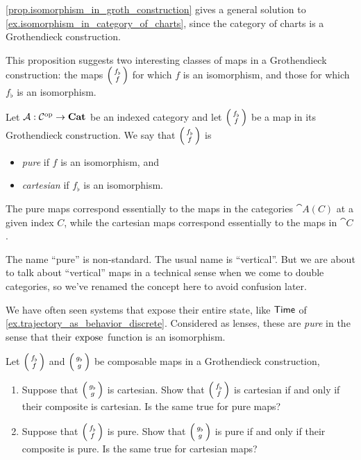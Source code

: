 \documentclass[DynamicalBook]{subfiles}
\begin{document}
\begin{remark}
  \cref{prop.isomorphism_in_groth_construction} gives a general solution to
  \cref{ex.isomorphism_in_category_of_charts}, since the category of charts is a
  Grothendieck construction.
\end{remark}

This proposition suggests two interesting classes of maps in a Grothendieck
construction: the maps $\lens{f_{\flat}}{f}$ for which $f$ is an isomorphism, and
those for which $f_{\flat}$ is an isomorphism.
\begin{definition}\label{def.pure_and_cartesian}
Let $\mathcal{A} : \mathcal{C}^{\textnormal{op}} \to \textbf{Cat}$ be an indexed category and let
$\lens{f_{\flat}}{f}$ be a map in its Grothendieck construction. We say that
$\lens{f_{\flat}}{f}$ is
\begin{itemize}
\item \emph{pure} if $f$ is an isomorphism, and
 \item \emph{cartesian} if $f_{\flat}$ is an isomorphism.
\end{itemize}
\end{definition}

The pure maps correspond essentially to the maps in the categories $\cat{A}(C)$
at a given index $C$, while the cartesian maps correspond essentially to the
maps in $\cat{C}$.

\begin{remark}
  The name ``pure'' is non-standard. The usual name is ``vertical''. But we are
  about to talk about ``vertical'' maps in a technical sense when we come to
  double categories, so we've renamed the concept here to avoid confusion later.
\end{remark}

\begin{example}
  We have often seen systems that expose their entire state, like $\mathsf{Time}$ 
  of \cref{ex.trajectory_as_behavior_discrete}. Considered as lenses, these are
  \emph{pure} in the sense that their $\mathrm{expose}_{\mathsf{}}$ function is an isomorphism.
\end{example}

\begin{exercise}\label{ex.2-of-3_for_pure_cartesian}
  Let $\lens{f_{\flat}}{f}$ and $\lens{g_{\flat}}{g}$ be composable maps in a Grothendieck construction,
  \begin{enumerate}
    \item Suppose that $\lens{g_{\flat}}{g}$ is cartesian.  Show that
      $\lens{f_{\flat}}{f}$ is cartesian if and only if their composite is
      cartesian. Is the same true for pure maps?
    \item Suppose that $\lens{f_{\flat}}{f}$ is pure. Show that
      $\lens{g_{\flat}}{g}$ is pure if and only if their composite is pure. Is
      the same true for cartesian maps?
  \end{enumerate}
\end{exercise}
\end{document}
